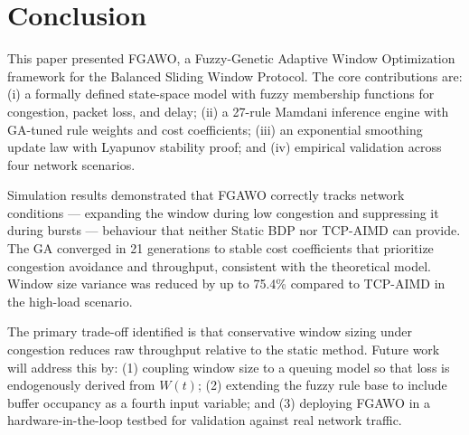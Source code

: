 \documentclass[10pt, twocolumn]{IEEEtran}
\theoremstyle{definition}
\begin{document}
\section{Conclusion}
\label{sec:conclusion}

This paper presented FGAWO, a Fuzzy-Genetic Adaptive Window Optimization framework for the Balanced Sliding Window Protocol. The core contributions are: (i) a formally defined state-space model with fuzzy membership functions for congestion, packet loss, and delay; (ii) a 27-rule Mamdani inference engine with GA-tuned rule weights and cost coefficients; (iii) an exponential smoothing update law with Lyapunov stability proof; and (iv) empirical validation across four network scenarios.

Simulation results demonstrated that FGAWO correctly tracks network conditions — expanding the window during low congestion and suppressing it during bursts — behaviour that neither Static BDP nor TCP-AIMD can provide. The GA converged in 21 generations to stable cost coefficients that prioritize congestion avoidance and throughput, consistent with the theoretical model. Window size variance was reduced by up to 75.4\% compared to TCP-AIMD in the high-load scenario.

The primary trade-off identified is that conservative window sizing under congestion reduces raw throughput relative to the static method. Future work will address this by: (1) coupling window size to a queuing model so that loss is endogenously derived from $W(t)$; (2) extending the fuzzy rule base to include buffer occupancy as a fourth input variable; and (3) deploying FGAWO in a hardware-in-the-loop testbed for validation against real network traffic.
\end{document}
